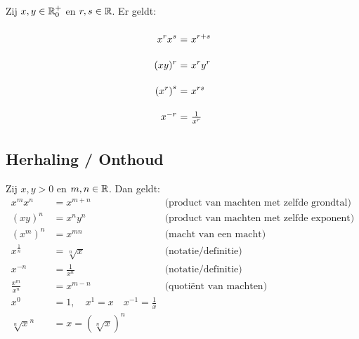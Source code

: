 \documentclass{ximera}
\begin{document}
\begin{proposition}
	Zij $x,y\in\mathbb{R}_0^+$ en $r,s\in\mathbb{R}$. Er geldt:
	\[
	\arraycolsep=1.4pt\def\arraystretch{2.2}
	\begin{array}{r@{\ =\ }l}
	\ds{x^{r}x^{s}}&\ds{x^{r+s}}\\
	\ds{(xy)^r}&\ds{x^ry^r}\\
	\ds{\left(x^{r}\right)^{s}}&\ds{x^{rs}}\\
	x^{-r} & \frac{1}{x^r} \\
	\end{array}
	\]
\end{proposition}



\subsection{Herhaling / Onthoud }\label{machtenrekenregels}

\begin{proposition}
Zij $x,y>0$ en $m,n\in\mathbb R$. Dan geldt:
\begin{align*}
	x^{m}x^{n}          &= x^{m+n}     & \text{(product van machten met zelfde grondtal)}\\
	(xy)^n              &= x^ny^n      & \text{(product van machten met zelfde exponent)}\\
	\left(x^{m}\right)^{n}&= x^{mn}    & \text{(macht van een macht)}\\	
	x^{\frac1n} &= \sqrt[n] x          & \text{(notatie/definitie)}\\
	x^{-n}          &= \frac{1}{x^n}  & \text{(notatie/definitie)}\\
	\frac{x^{m}}{x^{n}} &= x^{m-n}      & \text{(quotiënt van machten)} \\
	x^0&=1, \quad x^1=x \quad x^{-1}=\frac1x \\
	\sqrt[n]{x}^n & = x = (\sqrt[n]{x})^n
\end{align*}
\end{proposition}
\end{document}
